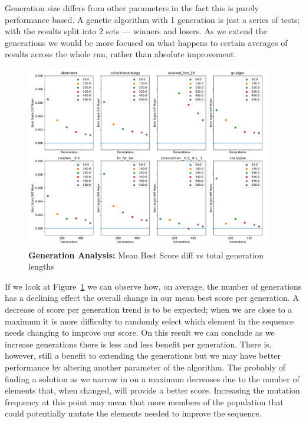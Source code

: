 Generation size differs from other parameters in the fact this is purely performance based.
A genetic algorithm with 1 generation is just a series of tests;
with the results split into 2 sets --- winners and losers.
As we extend the generations we would be more focused on what happens to certain averages of results across the whole run, rather than absolute improvement.

\begin{figure}[ht]
    \includegraphics[width=0.95\textwidth, keepaspectratio, center]{./img/plots/GENS_mean_bs_diff_v_gens_all.pdf}
    \caption{\textbf{Generation Analysis:} Mean Best Score diff vs total generation lengths}\label{fig:GENS-mean-bs-diff-v-gens-all}
\end{figure}

If we look at Figure~\ref{fig:GENS-mean-bs-diff-v-gens-all} we can observe how, on average, the number of generations has a declining effect the overall change in our mean best score per generation.
A decrease of score per generation trend is to be expected;
when we are close to a maximum it is more difficulty to randomly select which element in the sequence needs changing to improve our score.
On this result we can conclude as we increase generations there is less and less benefit per generation.
There is, however, still a benefit to extending the generations but we may have better performance by altering another parameter of the algorithm.
The probably of finding a solution as we narrow in on a maximum decreases due to the number of elements that, when changed, will provide a better score.
Increasing the mutation frequency at this point may mean that more members of the population that could potentially mutate the elements needed to improve the sequence.

